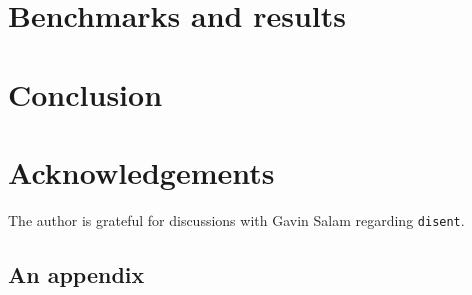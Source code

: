 \documentclass[submission, PhysCodeb]{SciPost}
\begin{document}
\section{Benchmarks and results}
\label{sec:benchmarks}

\section{Conclusion}
\label{sec:conclusion}

\section*{Acknowledgements}
The author is grateful for discussions with Gavin Salam regarding {\tt disent}. 


\begin{appendix}

  \section{An appendix}

\end{appendix}



\nolinenumbers
\end{document}
